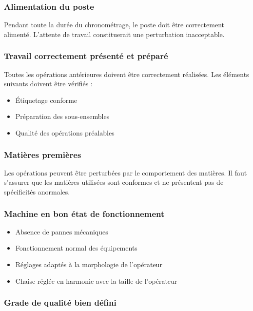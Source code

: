 \documentclass[a4paper,12pt]{article}
\begin{document}
\subsubsection{Alimentation du poste}

Pendant toute la durée du chronométrage, le poste doit être correctement alimenté. L'attente de travail constituerait une perturbation inacceptable.

\subsubsection{Travail correctement présenté et préparé}

Toutes les opérations antérieures doivent être correctement réalisées. Les éléments suivants doivent être vérifiés :
\begin{itemize}
    \item Étiquetage conforme
    \item Préparation des sous-ensembles
    \item Qualité des opérations préalables
\end{itemize}

\subsubsection{Matières premières}

Les opérations peuvent être perturbées par le comportement des matières. Il faut s'assurer que les matières utilisées sont conformes et ne présentent pas de spécificités anormales.

\subsubsection{Machine en bon état de fonctionnement}

\begin{itemize}
    \item Absence de pannes mécaniques
    \item Fonctionnement normal des équipements
    \item Réglages adaptés à la morphologie de l'opérateur
    \item Chaise réglée en harmonie avec la taille de l'opérateur
\end{itemize}

\subsubsection{Grade de qualité bien défini}
\end{document}
